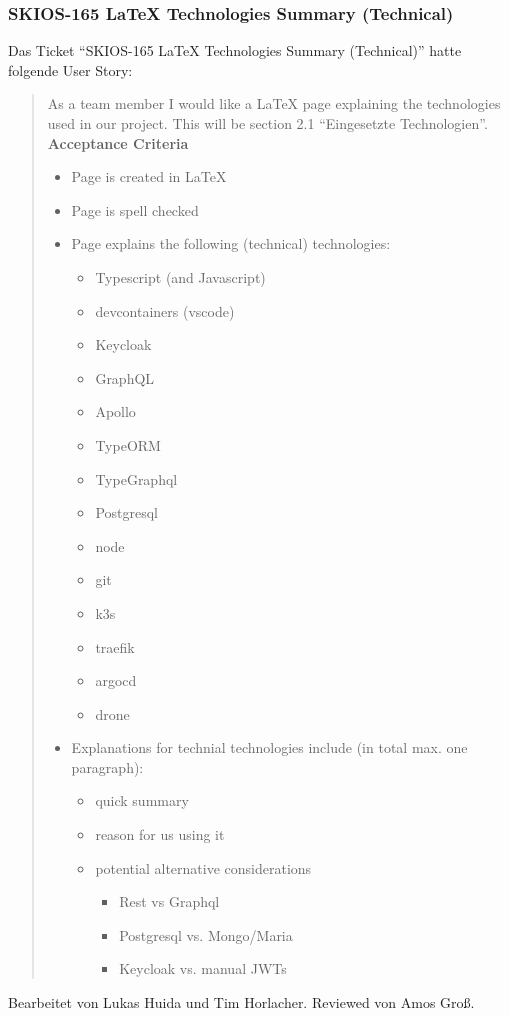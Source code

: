 \subsubsection{SKIOS-165 LaTeX Technologies Summary (Technical)}
Das Ticket \enquote{SKIOS-165 LaTeX Technologies Summary (Technical)} hatte folgende User Story:
\begin{quotation}
    As a team member I would like a LaTeX page explaining the technologies used in our project.
    This will be section 2.1 \enquote{Eingesetzte Technologien}. \\
\textbf{Acceptance Criteria}
\begin{itemize}
    \item Page is created in LaTeX
    \item Page is spell checked
    \item Page explains the following (technical) technologies:
    \begin{itemize}
        \item Typescript (and Javascript)
        \item devcontainers (vscode)
        \item Keycloak
        \item GraphQL
        \item Apollo
        \item TypeORM
        \item TypeGraphql
        \item Postgresql
        \item node
        \item git
        \item k3s
        \item traefik
        \item argocd
        \item drone
    \end{itemize}
    \item Explanations for technial technologies include (in total max. one paragraph):
    \begin{itemize}
        \item quick summary 
        \item reason for us using it
        \item potential alternative considerations 
        \begin{itemize}
            \item Rest vs Graphql
            \item Postgresql vs. Mongo/Maria
            \item Keycloak vs. manual JWTs
        \end{itemize}
    \end{itemize}
\end{itemize}
\end{quotation}
Bearbeitet von Lukas Huida und Tim Horlacher.
Reviewed von Amos Groß.

